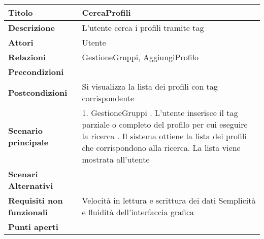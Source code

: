 \begin{tabular} {|P{4.5cm}|P{11cm}|}
  \hline
  \textbf{Titolo}                   & CercaProfili                                              \\
  \hline
  \textbf{Descrizione}              & L'utente cerca i profili tramite tag                      \\
  \hline
  \textbf{Attori}                   & Utente                                                    \\
  \hline
  \textbf{Relazioni}                & GestioneGruppi, AggiungiProfilo                           \\
  \hline
  \textbf{Precondizioni}            &                                                           \\
  \hline
  \textbf{Postcondizioni}           & Si visualizza la lista dei profili con tag corrispondente \\
  \hline
  \textbf{Scenario principale}      & 1. GestioneGruppi . L'utente inserisce il tag parziale o completo del profilo per cui eseguire la ricerca . Il sistema ottiene la lista dei profili che corrispondono alla ricerca. La lista viene mostrata all'utente                                                         \\
  \hline
  \textbf{Scenari Alternativi}      &                                                           \\
  \hline
  \textbf{Requisiti non funzionali} & Velocità in lettura e scrittura dei dati\linebreak
  Semplicità e fluidità dell'interfaccia grafica                                                \\
  \hline
  \textbf{Punti aperti}             &                                                           \\
  \hline
\end{tabular}
\hfill
\break

